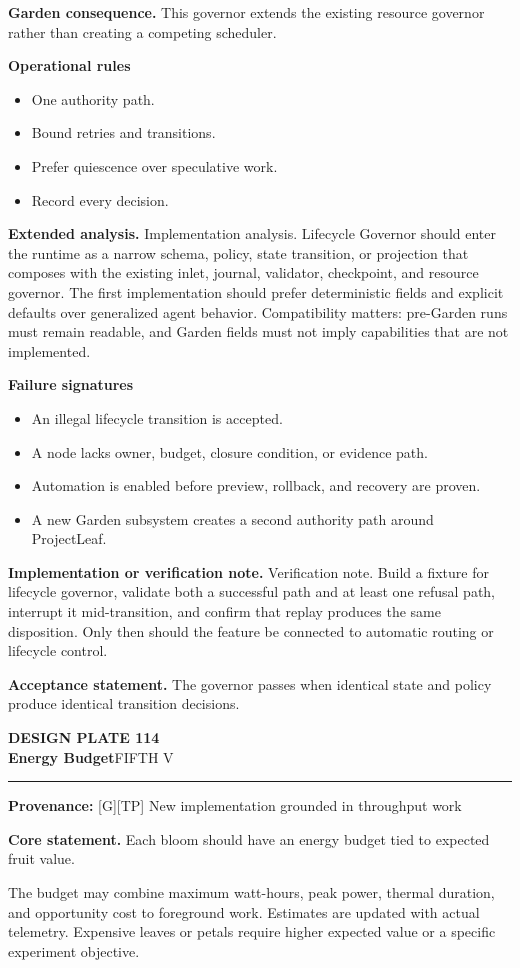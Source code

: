 \documentclass[10pt,letterpaper,oneside]{article}
\newcommand{\prov}[1]{\textcolor{gardenBlue}{\sffamily\footnotesize\textbf{Provenance:} #1}}
\newcommand{\platetitle}[3]{%
  \begin{minipage}[t][0.54in][t]{\textwidth}
  {\sffamily\bfseries\color{gardenDeep}\fontsize{9}{10}\selectfont DESIGN PLATE #1}\\[-1pt]
  {\sffamily\bfseries\color{gardenInk}\fontsize{16.5}{18}\selectfont #2}\hfill{\sffamily\color{gardenGreen}\large #3}
  \end{minipage}\vspace{-2pt}\hrule\vspace{5pt}}
\begin{document}
\textbf{Garden consequence.} This governor extends the existing resource governor rather than creating a competing scheduler.

\textbf{Operational rules}
\begin{itemize}
\item One authority path.
\item Bound retries and transitions.
\item Prefer quiescence over speculative work.
\item Record every decision.
\end{itemize}
\textbf{Extended analysis.} Implementation analysis. Lifecycle Governor should enter the runtime as a narrow schema, policy, state transition, or projection that composes with the existing inlet, journal, validator, checkpoint, and resource governor. The first implementation should prefer deterministic fields and explicit defaults over generalized agent behavior. Compatibility matters: pre-Garden runs must remain readable, and Garden fields must not imply capabilities that are not implemented.

\textbf{Failure signatures}
\begin{itemize}
\item An illegal lifecycle transition is accepted.
\item A node lacks owner, budget, closure condition, or evidence path.
\item Automation is enabled before preview, rollback, and recovery are proven.
\item A new Garden subsystem creates a second authority path around ProjectLeaf.
\end{itemize}
\textbf{Implementation or verification note.} Verification note. Build a fixture for lifecycle governor, validate both a successful path and at least one refusal path, interrupt it mid-transition, and confirm that replay produces the same disposition. Only then should the feature be connected to automatic routing or lifecycle control.

\begin{acceptbox}
\textbf{Acceptance statement.} The governor passes when identical state and policy produce identical transition decisions.
\end{acceptbox}
\newpage
\platetitle{114}{Energy Budget}{FIFTH V}
\prov{[G][TP] New implementation grounded in throughput work}
\fontsize{8.85}{10.45}\selectfont
\begin{corebox}
\textbf{Core statement.} Each bloom should have an energy budget tied to expected fruit value.
\end{corebox}
The budget may combine maximum watt-hours, peak power, thermal duration, and opportunity cost to foreground work. Estimates are updated with actual telemetry. Expensive leaves or petals require higher expected value or a specific experiment objective.
\end{document}

